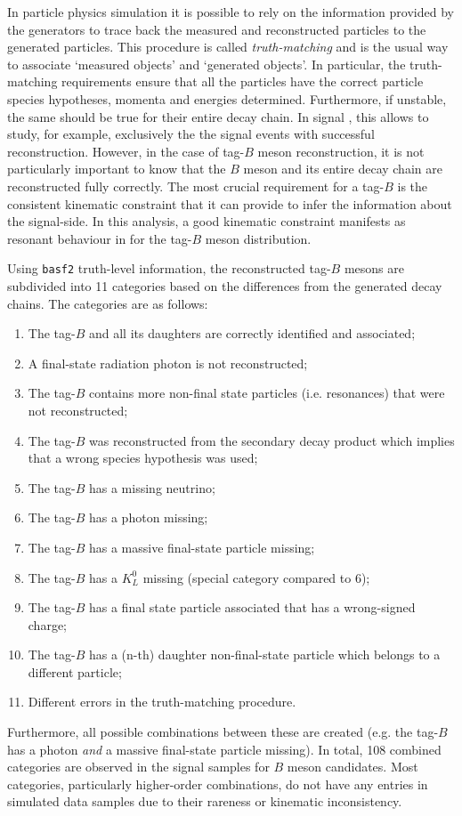In particle physics simulation it is possible to rely on the information provided by the \MC generators to trace back the measured and reconstructed particles to the generated particles.
This procedure is called \textit{truth-matching} and is the usual way to associate `measured objects' and `generated objects'.
In particular, the truth-matching requirements ensure that all the particles have the correct particle species hypotheses, momenta and energies determined.
Furthermore, if unstable, the same should be true for their entire decay chain.
In signal \MC, this allows to study, for example, exclusively the the signal events with successful reconstruction.
However, in the case of tag-$B$ meson reconstruction, it is not particularly important to know that the $B$ meson and its entire decay chain are reconstructed fully correctly.
The most crucial requirement for a tag-$B$ is the consistent kinematic constraint that it can provide to infer the information about the signal-side.
In this analysis, a good kinematic constraint manifests as resonant behaviour in \Mbc for the tag-$B$ meson distribution.

Using \texttt{basf2} truth-level information, the reconstructed tag-$B$ mesons are subdivided into 11 categories based on the differences from the generated decay chains.
The categories are as follows:
\begin{enumerate}
    \setcounter{enumi}{0}
    \item The tag-$B$ and all its daughters are correctly identified and associated;
    \item A final-state radiation photon is not reconstructed;
    \item The tag-$B$ contains more non-final state particles (i.e. resonances) that were not reconstructed;
    \item The tag-$B$ was reconstructed from the secondary decay product which implies that a wrong species hypothesis was used;
    \item The tag-$B$ has a missing neutrino;
    \item The tag-$B$ has a photon missing;
    \item The tag-$B$ has a massive final-state particle missing;
    \item The tag-$B$ has a $K_L^0$ missing (special category compared to 6);
    \item The tag-$B$ has a final state particle associated that has a wrong-signed charge;
    \item The tag-$B$ has a (n-th) daughter non-final-state particle which belongs to a different particle;
    \item Different errors in the truth-matching procedure.
\end{enumerate}
Furthermore, all possible combinations between these are created (e.g. the tag-$B$ has a photon \textit{and} a massive final-state particle missing).
In total, 108 combined categories are observed in the \BtoXsgamma signal \MC samples for $B$ meson candidates.
Most categories, particularly higher-order combinations, do not have any entries in simulated data samples due to their rareness or kinematic inconsistency.

